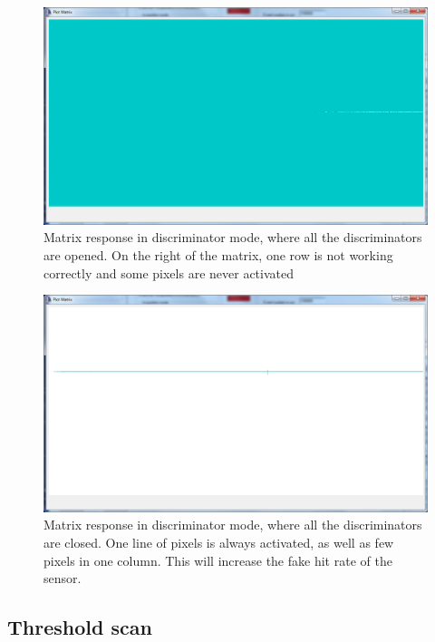   \begin{figure}[!tbh]
    \centering
    \includegraphics[width=\textwidth]{Pictures/labTests/th0.png}
    \caption{Matrix response in discriminator mode, where all the discriminators are opened. On the right of the matrix, one row is not working correctly and some pixels are never activated}
    \label{fig:openPixel}
  \end{figure}
   
  \begin{figure}[!tbh]
    \centering
    \includegraphics[width=\textwidth]{Pictures/labTests/th255.png}
    \caption{Matrix response in discriminator mode, where all the discriminators are closed. One line of pixels is always activated, as well as few pixels in one column. This will increase the fake hit rate of the sensor.}
    \label{fig:closePixel}
  \end{figure}

  \subsection{Threshold scan}

